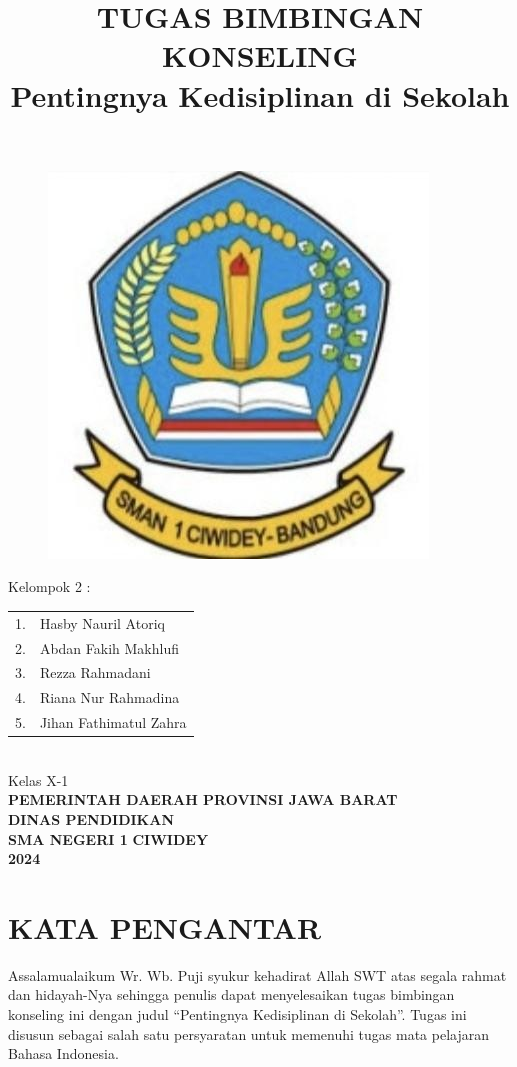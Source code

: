 \documentclass[f4paper,12pt, left=2.5cm,right=2cm,bottom=2cm, bahasa]{article}
\date{}
\title{TUGAS BIMBINGAN KONSELING \\ Pentingnya Kedisiplinan di Sekolah}
\begin{document}
\maketitle
\thispagestyle{empty}
\begin{figure}[ht]
    \centering
    \includegraphics[width=0.3\linewidth]{images/sman1.png}
\end{figure}

\begin{center}
    Kelompok 2 : \\
    \begin{tabular}{ll}
         1.& Hasby Nauril Atoriq  \\
         2.& Abdan Fakih Makhlufi \\
         3.& Rezza Rahmadani \\
         4.& Riana Nur Rahmadina \\
         5.& Jihan Fathimatul Zahra\\
    \end{tabular}\\
    \vspace{0.5cm}
    Kelas X-1\\
    \vspace{1cm}
    \textbf{PEMERINTAH DAERAH PROVINSI JAWA BARAT}\\
    \textbf{DINAS PENDIDIKAN}\\
    \textbf{SMA NEGERI 1}
    \textbf{CIWIDEY}\\
    \textbf{2024}
\end{center}
\pagebreak
\onehalfspacing{}
\section*{KATA PENGANTAR}
\setcounter{section}{1}


Assalamualaikum Wr. Wb. Puji syukur kehadirat Allah SWT atas segala rahmat dan hidayah-Nya sehingga penulis dapat menyelesaikan tugas bimbingan konseling ini dengan judul “Pentingnya Kedisiplinan di Sekolah”. Tugas ini disusun sebagai salah satu persyaratan untuk memenuhi tugas mata pelajaran Bahasa Indonesia. 
\end{document}
